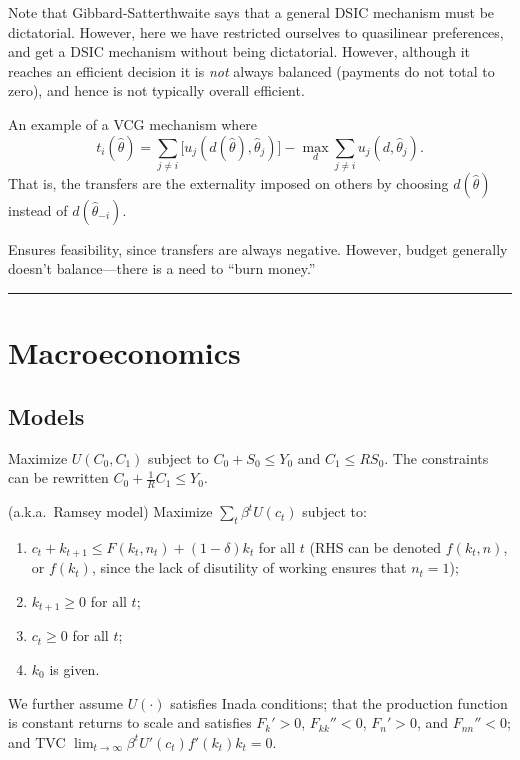 \documentclass[8pt,letterpaper, landscape]{extarticle} %
\begin{document}
\begin{multicols}{3}
\begin{description}
Note that Gibbard-Satterthwaite says that a general DSIC mechanism must be dictatorial. However, here we have restricted ourselves to quasilinear preferences, and get a DSIC mechanism without being dictatorial. However, although it reaches an efficient decision it is \textit{not} always balanced (payments do not total to zero), and hence is not typically overall efficient.

 An example of a VCG mechanism where
\[ t_i (\hat{\theta}) = \sum_{j \neq i} \bigl [ u_j (d(\hat{\theta}), \hat{\theta}_j) \bigr ] - \max_{d} \sum_{j \neq i} u_j (d, \hat{\theta}_j) . \]
That is, the transfers are the externality imposed on others by choosing $ d ( \hat{\theta} ) $ instead of $ d ( \hat{\theta}_{-i} ) $.

Ensures feasibility, since transfers are always negative. However, budget generally doesn't balance---there is a need to ``burn money.''

\hrule
\section{Macroeconomics}
\subsection{Models}
 Maximize $ U(C_0, C_1) $ subject to $ C_0 + S_0 \leq Y_0 $ and $ C_1 \leq R S_0 $. The constraints can be rewritten $ C_0 + \tfrac{1}{R} C_1 \leq Y_0 $.

 (a.k.a.\ Ramsey model) Maximize $ \sum_{t} \beta^t U(c_t) $ subject to:
\begin{enumerate}
\item $ c_t + k_{t+1} \leq F(k_t, n_t) + (1- \delta) k_t  $ for all $ t $ (RHS can be denoted $ f(k_t, n) $, or $ f(k_t) $, since the lack of disutility of working ensures that $ n_t=1 $);
\item $ k_{t+1} \geq 0 $ for all $ t $;
\item $ c_t \geq 0 $ for all $ t $;
\item $ k_0 $ is given.
\end{enumerate}
We further assume $ U (\cdot) $ satisfies Inada conditions; that the production function is constant returns to scale and satisfies $ F_{k}' > 0 $, $ F_{kk}'' < 0 $, $ F_{n}' > 0 $, and $ F_{nn}'' < 0 $; and TVC $ \lim_{t \to \infty} \beta^t U'(c_t) f'(k_t) k_t = 0 $.


\end{description}
\end{multicols}
\end{document}
